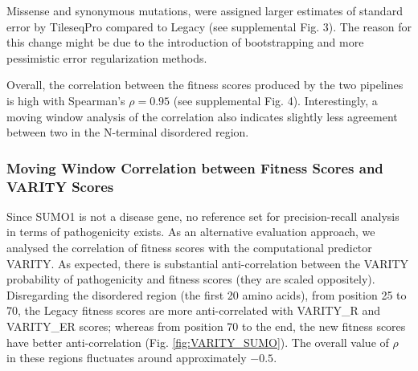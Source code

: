 \documentclass{article}
\begin{document}
Missense and synonymous mutations, were assigned larger estimates of standard error by TileseqPro compared to Legacy (see supplemental Fig. 3). The reason for this change might be due to the introduction of bootstrapping and more pessimistic error regularization methods.


Overall, the correlation between the fitness scores produced by the two  pipelines is high with Spearman's $\rho = 0.95$ (see supplemental Fig. 4). Interestingly, a moving window analysis of the correlation also indicates slightly less agreement between two in the N-terminal disordered region.



\subsubsection{Moving Window Correlation between Fitness Scores and VARITY Scores}
Since SUMO1 is not a disease gene, no reference set for precision-recall analysis in terms of pathogenicity exists. As an alternative evaluation approach, we analysed the correlation of fitness scores with the computational predictor VARITY\cite{wu_improved_2021}.  As expected, there is substantial anti-correlation between the VARITY probability of pathogenicity and fitness scores (they are scaled oppositely). Disregarding the disordered region (the first 20 amino acids), from position 25 to 70, the Legacy fitness scores are more anti-correlated with VARITY\_R and VARITY\_ER scores; whereas from position 70 to the end, the new fitness scores have better anti-correlation (Fig. \ref{fig:VARITY_SUMO}). The overall value of $\rho$ in these regions fluctuates around approximately $-0.5$.
\end{document}

